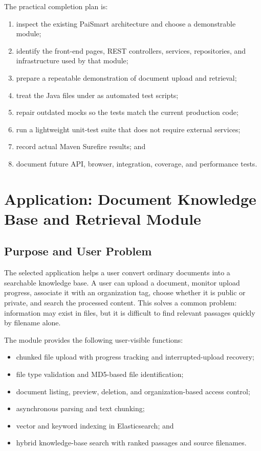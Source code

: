 \documentclass[11pt,a4paper]{article}
\begin{document}
The practical completion plan is:
\begin{enumerate}[leftmargin=2em]
  \item inspect the existing PaiSmart architecture and choose a demonstrable module;
  \item identify the front-end pages, REST controllers, services, repositories, and
        infrastructure used by that module;
  \item prepare a repeatable demonstration of document upload and retrieval;
  \item treat the Java files under
         as automated test scripts;
  \item repair outdated mocks so the tests match the current production code;
  \item run a lightweight unit-test suite that does not require external services;
  \item record actual Maven Surefire results; and
  \item document future API, browser, integration, coverage, and performance tests.
\end{enumerate}

\section{Application: Document Knowledge Base and Retrieval Module}

\subsection{Purpose and User Problem}

The selected application helps a user convert ordinary documents into a searchable
knowledge base. A user can upload a document, monitor upload progress, associate it
with an organization tag, choose whether it is public or private, and search the
processed content. This solves a common problem: information may exist in files, but it
is difficult to find relevant passages quickly by filename alone.

The module provides the following user-visible functions:
\begin{itemize}[leftmargin=2em]
  \item chunked file upload with progress tracking and interrupted-upload recovery;
  \item file type validation and MD5-based file identification;
  \item document listing, preview, deletion, and organization-based access control;
  \item asynchronous parsing and text chunking;
  \item vector and keyword indexing in Elasticsearch; and
  \item hybrid knowledge-base search with ranked passages and source filenames.
\end{itemize}
\end{document}
